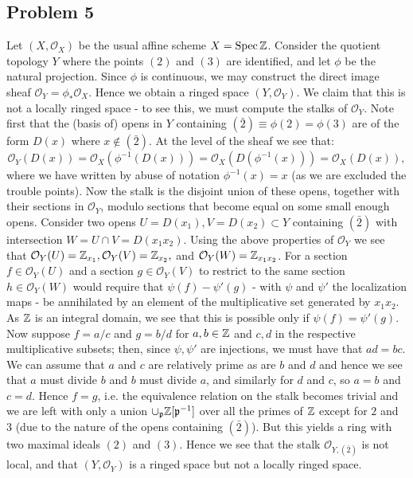 \documentclass{../../mathnotes}
\begin{document}
\subsection*{Problem 5}

Let $(X,\mathcal{O}_X)$ be the usual affine scheme $X=\operatorname{Spec} \mathbb{Z}$. Consider the quotient topology $Y$ where the points $(2)$ and $(3)$ are identified, and let
$\phi$ be the natural projection. Since $\phi$ is continuous, we may construct the direct image sheaf $\mathcal{O}_Y=\phi_*\mathcal{O}_X$. Hence we
obtain a ringed space $(Y,\mathcal{O}_Y)$. We claim that this is not a locally ringed space - to see this, we must compute the stalks of $\mathcal{O}_Y$.
Note first that the (basis of) opens in $Y$ containing $(\bar 2)\equiv \phi(2)=\phi(3)$ are of the form $D(x)$ where $x\notin (\bar 2)$. At the level of the sheaf
we see that:
\[\mathcal{O}_Y(D(x))=\mathcal{O}_X(\phi^{-1}(D(x)))=\mathcal{O}_X(D(\phi^{-1}(x)))=\mathcal{O}_X(D(x)),\]
where we have written by abuse of notation $\phi^{-1}(x)=x$ (as we are excluded the trouble points). 
Now the stalk is the disjoint union of these opens, together with their sections in $\mathcal{O}_Y$, modulo sections that become equal on some small enough opens.
Consider two opens $U=D(x_1),V=D(x_2)\subset Y$ containing $(\bar 2)$ with intersection $W=U\cap V=D(x_1x_2)$. Using the above properties of $\mathcal{O}_Y$
we see that $\mathcal{O}_Y(U)=\mathbb{Z}_{x_1},\mathcal{O}_Y(V)=\mathbb{Z}_{x_2},$ and $\mathcal{O}_Y(W)=\mathbb{Z}_{x_1x_2}$. For a section $f\in\mathcal{O}_Y(U)$ and a section
$g\in\mathcal{O}_Y(V)$ to restrict to the same section $h\in\mathcal{O}_Y(W)$ would require that $\psi(f)-\psi'(g)$ - with $\psi$ and $\psi'$ the localization maps -
be annihilated by an element of the multiplicative set generated by $x_1x_2$. As $\mathbb{Z}$ is an integral domain, 
we see that this is possible only if $\psi(f)=\psi'(g)$.
Now suppose $f=a/c$ and $g=b/d$ for $a,b\in\mathbb{Z}$ and $c,d$ in the respective multiplicative subsets; then, since $\psi,\psi'$ are injections, we must have that $ad=bc$.
We can assume that $a$ and $c$ are relatively prime as are $b$ and $d$ and hence we see that $a$ must divide $b$ and $b$ must divide $a$, and similarly for $d$ and $c$,
so $a=b$ and $c=d$. Hence $f=g$, i.e. the equivalence relation on the stalk becomes trivial and we are left with only a union $\cup_{\mathfrak p}\mathbb{Z}[\mathfrak p^{-1}]$ over all
the primes of $\mathbb{Z}$ except for $2$ and $3$ (due to the nature of the opens containing $(\bar 2)$). But this yields a ring with two maximal ideals $(2)$ and $(3)$.
Hence we see that the stalk $\mathcal{O}_{Y,(\bar 2)}$ is not local, and that $(Y,\mathcal{O}_Y)$ is a ringed space but not a locally ringed space.
\end{document}
